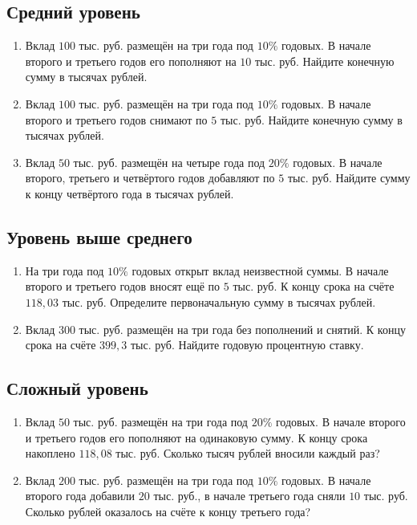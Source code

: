 \documentclass[a4paper,12pt]{article}
\begin{document}
\subsection*{Средний уровень}
\begin{enumerate}[resume]
\item Вклад $100$ тыс. руб. размещён на три года под $10\%$ годовых. В начале второго и третьего годов его пополняют на $10$ тыс. руб. Найдите конечную сумму в тысячах рублей.
\item Вклад $100$ тыс. руб. размещён на три года под $10\%$ годовых. В начале второго и третьего годов снимают по $5$ тыс. руб. Найдите конечную сумму в тысячах рублей.
\item Вклад $50$ тыс. руб. размещён на четыре года под $20\%$ годовых. В начале второго, третьего и четвёртого годов добавляют по $5$ тыс. руб. Найдите сумму к концу четвёртого года в тысячах рублей.
\end{enumerate}
\subsection*{Уровень выше среднего}
\begin{enumerate}[resume]
\item На три года под $10\%$ годовых открыт вклад неизвестной суммы. В начале второго и третьего годов вносят ещё по $5$ тыс. руб. К концу срока на счёте $118{,}03$ тыс. руб. Определите первоначальную сумму в тысячах рублей.
\item Вклад $300$ тыс. руб. размещён на три года без пополнений и снятий. К концу срока на счёте $399{,}3$ тыс. руб. Найдите годовую процентную ставку.
\end{enumerate}
\subsection*{Сложный уровень}
\begin{enumerate}[resume]
\item Вклад $50$ тыс. руб. размещён на три года под $20\%$ годовых. В начале второго и третьего годов его пополняют на одинаковую сумму. К концу срока накоплено $118{,}08$ тыс. руб. Сколько тысяч рублей вносили каждый раз?
\item Вклад $200$ тыс. руб. размещён на три года под $10\%$ годовых. В начале второго года добавили $20$ тыс. руб., в начале третьего года сняли $10$ тыс. руб. Сколько рублей оказалось на счёте к концу третьего года?
\end{enumerate}
\end{document}
